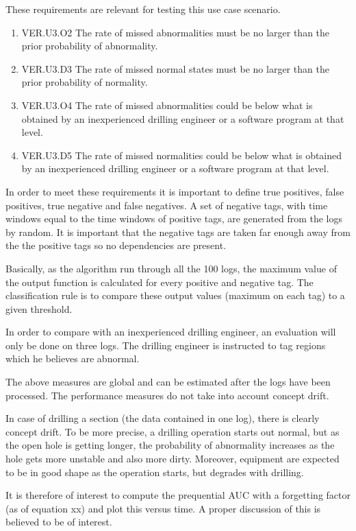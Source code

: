 \documentclass{article}
\theoremstyle{theorem}
\theoremstyle{definition}
\begin{document}
These requirements are relevant for testing this use case scenario.  
\begin{enumerate}
\item VER.U3.O2 The rate of missed abnormalities must be no larger than the prior probability of abnormality.  
\item VER.U3.D3 The rate of missed normal states must be no larger than the prior probability of normality.  
\item VER.U3.O4  The rate of missed abnormalities could be below what is obtained by an inexperienced drilling engineer or a software program at that level. 
\item VER.U3.D5 The rate of missed normalities could be below what is obtained by an inexperienced drilling engineer or a software program at that level.
\end{enumerate}

In order to meet these requirements it is important to define true positives, false positives, true negative and false negatives.  A set of negative tags, with time windows equal to the time windows of positive tags, are generated from the logs by random.  It is important that the negative tags are taken far enough away from the the positive tags so no dependencies are present.  

Basically, as the algorithm run through all the 100 logs, the maximum value of the output function is calculated for every positive and negative tag.  The classification rule is to compare these output values (maximum on each tag) to a given threshold.  

In order to compare with an inexperienced drilling engineer, an evaluation will only be done on three logs.  The drilling engineer is instructed to tag regions which he believes are abnormal.

The above measures are global and can be estimated after the logs have been processed.  The performance measures do not take into account concept drift.  

In case of drilling a section (the data contained in one log), there is clearly concept drift.  To be more precise, a drilling operation starts out normal, but as the open hole is getting longer, the probability of abnormality increases as the hole gets more unstable and also more dirty. Moreover, equipment are expected to be in good shape as the operation starts, but degrades with drilling.  

It is therefore of interest to compute the prequential AUC with a forgetting factor (as of equation xx) and plot this versus time.  A proper discussion of this is believed to be of interest.
\end{document}
